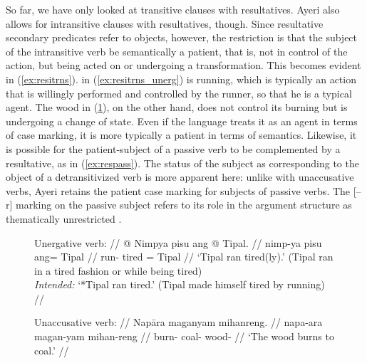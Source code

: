 So far, we have only looked at transitive clauses with resultatives. Ayeri also
allows for intransitive clauses with resultatives, though. Since resultative
secondary predicates refer to objects, however, the restriction is that the
subject of the intransitive verb be semantically a patient, that is, not in
control of the action, but being acted on or undergoing a transformation. This
becomes evident in (\ref{ex:resitrns}).  in 
(\ref{ex:resitrns_unerg}) is running, which is typically an action that is
willingly performed and controlled by the runner, so that he is a typical
agent. The wood in (\ref{ex:resitrns_unacc}), on the other hand, does not
control its burning but is undergoing a change of state. Even if the language
treats it as an agent in terms of case marking, it is more typically a patient
in terms of semantics. Likewise, it is possible for the patient-subject of a
passive verb to be complemented by a resultative, as in (\ref{ex:respass}). The
status of the subject as corresponding to the object of a detransitivized verb
is more apparent here: unlike with unaccusative verbs, Ayeri retains the
patient case marking for subjects of passive verbs. The [–\,r] marking on the
passive subject refers to its role in the argument structure as thematically
unrestricted \citep[324--348]{bresnan2016}.

\begin{figure}
\pex\label{ex:resitrns}
\a\label{ex:resitrns_unerg}\begingl
	\glpreamble Unergative verb: //
	\gla \upshape{\excl{}} @ Nimpya pisu ang @ Tipal. //
	\glb {} nimp-ya pisu ang= Tipal //
	\glc {} run-\TsgM{} tired \Aarg{}= Tipal //
	\glft \hphantom{\excl}`Tipal ran tired(ly).' (Tipal ran in a tired fashion 
		or while being tired) \\
		\hphantom{\excl}\textit{Intended:} `*Tipal ran tired.' (Tipal made
		himself tired by running) //
\endgl

\a\label{ex:resitrns_unacc}\begingl
	\glpreamble Unaccusative verb: //
	\gla Napāra maganyam mihanreng. //
	\glb napa-ara magan-yam mihan-reng //
	\glc burn-\TsgI{} coal-\Dat{} wood-\AargI{} //
	\glft `The wood burns to coal.' //
\endgl

\xe
\end{figure}

